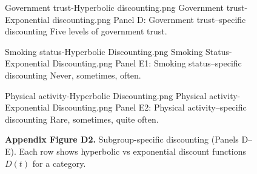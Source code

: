 \begin{figure}[t!]
  \centering

  \panelpair
    {Government trust-Hyperbolic discounting.png}
    {Government trust-Exponential discounting.png}
    {Panel D: Government trust–specific discounting}
    {Five levels of government trust.}

  \vspace{0.6em}

  \panelpair
    {Smoking status-Hyperbolic Discounting.png}
    {Smoking Status-Exponential Discounting.png}
    {Panel E1: Smoking status–specific discounting}
    {Never, sometimes, often.}

  \vspace{0.6em}

  \panelpair
    {Physical activity-Hyperbolic Discounting.png}
    {Physical activity-Exponential Discounting.png}
    {Panel E2: Physical activity–specific discounting}
    {Rare, sometimes, quite often.}

  \caption{\textbf{Appendix Figure D2.} Subgroup-specific discounting (Panels D–E). Each row shows hyperbolic vs exponential discount functions $D(t)$ for a category.}
  \label{fig:appendix_discounting_p2}
\end{figure}

\captionsetup[subfigure]{labelformat=parens,labelsep=space}
\FloatBarrier
